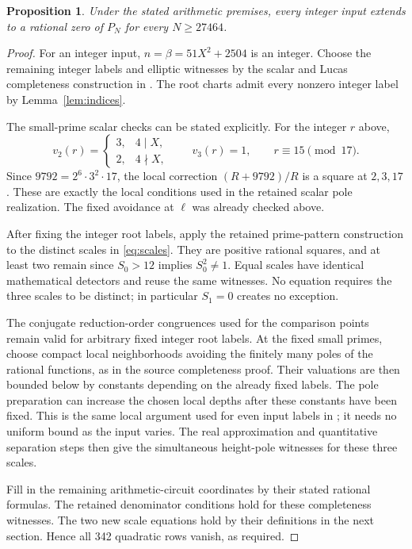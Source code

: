 \documentclass[11pt,a4paper]{article}
\newtheorem{proposition}[theorem]{Proposition}
\theoremstyle{remark}\newtheorem{remark}[theorem]{Remark}
\begin{document}
\begin{proposition}\label{prop:complete}
Under the stated arithmetic premises, every integer input
extends to a rational zero of $P_N$ for every $N\ge27464$.
\end{proposition}
\begin{proof}
For an integer input, $n=\beta=51X^2+2504$ is an integer.
Choose the remaining integer labels and elliptic witnesses
by the scalar and Lucas completeness construction in
\cite{Quartic317}. The root charts admit every nonzero
integer label by Lemma~\ref{lem:indices}.

The small-prime scalar checks can be stated explicitly.
For the integer $r$ above,
\[
 v_2(r)=\begin{cases}3,&4\mid X,\\2,&4\nmid X,\end{cases}
 \qquad v_3(r)=1,\qquad r\equiv15\pmod{17}.
\]
Since $9792=2^6\cdot3^2\cdot17$, the local correction
$(R+9792)/R$ is a square at $2,3,17$. These are exactly
the local conditions used in the retained scalar pole
realization. The fixed avoidance at $\ell$ was already
checked above.

After fixing the integer root labels, apply the retained
prime-pattern construction to the distinct scales in
\eqref{eq:scales}. They are positive rational squares, and
at least two remain since $S_0>12$ implies $S_0^2\ne1$.
Equal scales have identical mathematical detectors and
reuse the same witnesses. No equation requires the three
scales to be distinct; in particular $S_1=0$ creates no
exception.

The conjugate reduction-order congruences used for the
comparison points remain valid for arbitrary fixed integer
root labels. At the fixed small primes, choose compact
local neighborhoods avoiding the finitely many poles of
the rational functions, as in the source completeness proof.
Their valuations are then bounded below by constants
depending on the already fixed labels. The pole
preparation can increase the chosen local depths after these
constants have been fixed. This is the same local argument
used for even input labels in \cite{Quartic317}; it needs
no uniform bound as the input varies. The real approximation
and quantitative separation steps then give the simultaneous
height-pole witnesses for these three scales.

Fill in the remaining arithmetic-circuit coordinates by
their stated rational formulas. The retained denominator
conditions hold for these completeness witnesses. The two
new scale equations hold by their definitions in the next
section. Hence all 342 quadratic rows vanish, as required.
\end{proof}
\end{document}
